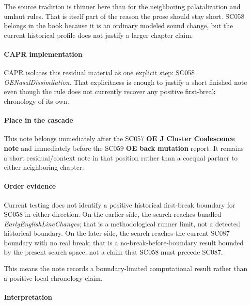 \documentclass[
  british,
  a4paper,
]{article}
\begin{document}
The source tradition is thinner here than for the neighboring
palatalization and umlaut rules. That is itself part of the reason the
prose should stay short. SC058 belongs in the book because it is an
ordinary modeled sound change, but the current historical profile does
not justify a larger chapter claim.

\paragraph{CAPR implementation}\label{capr-implementation-36}

CAPR isolates this residual material as one explicit step: SC058
\emph{OENasalDissimilation}. That explicitness is enough to justify a
short finished note even though the rule does not currently recover any
positive first-break chronology of its own.

\paragraph{Place in the cascade}\label{place-in-the-cascade-36}

This note belongs immediately after the SC057 \textbf{OE J Cluster
Coalescence note} and immediately before the SC059 \textbf{OE back
mutation} report. It remains a short residual/context note in that
position rather than a coequal partner to either neighboring chapter.

\paragraph{Order evidence}\label{order-evidence-36}

Current testing does not identify a positive historical first-break
boundary for SC058 in either direction. On the earlier side, the search
reaches bundled \emph{EarlyEnglishLineChanges}; that is a methodological
runner limit, not a detected historical boundary. On the later side, the
search reaches the current SC087 boundary with no real break; that is a
no-break-before-boundary result bounded by the present search space, not
a claim that SC058 must precede SC087.

This means the note records a boundary-limited computational result
rather than a positive local chronology claim.

\paragraph{Interpretation}\label{interpretation-36}
\end{document}

